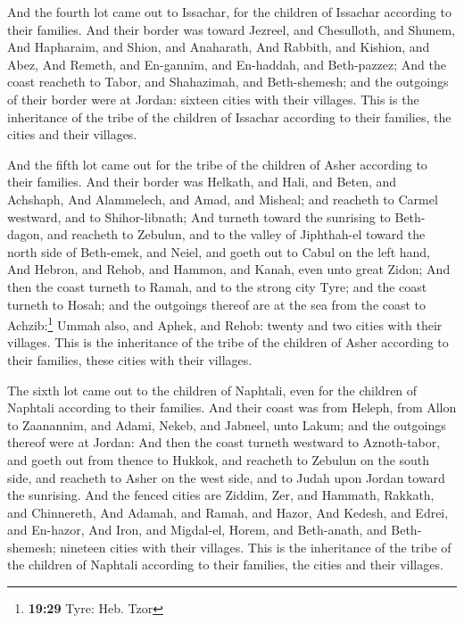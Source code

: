 And the fourth lot came out to Issachar, for the
children of Issachar according to their families.  And
their border was toward Jezreel, and Chesulloth, and Shunem,
 And Hapharaim, and Shion, and Anaharath, 
And Rabbith, and Kishion, and Abez,  And Remeth, and
En-gannim, and En-haddah, and Beth-pazzez;  And the coast
reacheth to Tabor, and Shahazimah, and Beth-shemesh; and the outgoings
of their border were at Jordan: sixteen cities with their villages.
 This is the inheritance of the tribe of the children of
Issachar according to their families, the cities and their villages.

 And the fifth lot came out for the tribe of the children
of Asher according to their families.  And their border
was Helkath, and Hali, and Beten, and Achshaph,  And
Alammelech, and Amad, and Misheal; and reacheth to Carmel westward, and
to Shihor-libnath;  And turneth toward the sunrising to
Beth-dagon, and reacheth to Zebulun, and to the valley of Jiphthah-el
toward the north side of Beth-emek, and Neiel, and goeth out to Cabul on
the left hand,  And Hebron, and Rehob, and Hammon, and
Kanah, even unto great Zidon;  And then the coast turneth
to Ramah, and to the strong city Tyre; and the coast turneth to Hosah;
and the outgoings thereof are at the sea from the coast to
Achzib:\footnote{\textbf{19:29} Tyre: Heb. Tzor}  Ummah
also, and Aphek, and Rehob: twenty and two cities with their villages.
 This is the inheritance of the tribe of the children of
Asher according to their families, these cities with their villages.

 The sixth lot came out to the children of Naphtali, even
for the children of Naphtali according to their families.
 And their coast was from Heleph, from Allon to
Zaanannim, and Adami, Nekeb, and Jabneel, unto Lakum; and the outgoings
thereof were at Jordan:  And then the coast turneth
westward to Aznoth-tabor, and goeth out from thence to Hukkok, and
reacheth to Zebulun on the south side, and reacheth to Asher on the west
side, and to Judah upon Jordan toward the sunrising.  And
the fenced cities are Ziddim, Zer, and Hammath, Rakkath, and Chinnereth,
 And Adamah, and Ramah, and Hazor,  And
Kedesh, and Edrei, and En-hazor,  And Iron, and
Migdal-el, Horem, and Beth-anath, and Beth-shemesh; nineteen cities with
their villages.  This is the inheritance of the tribe of
the children of Naphtali according to their families, the cities and
their villages.

